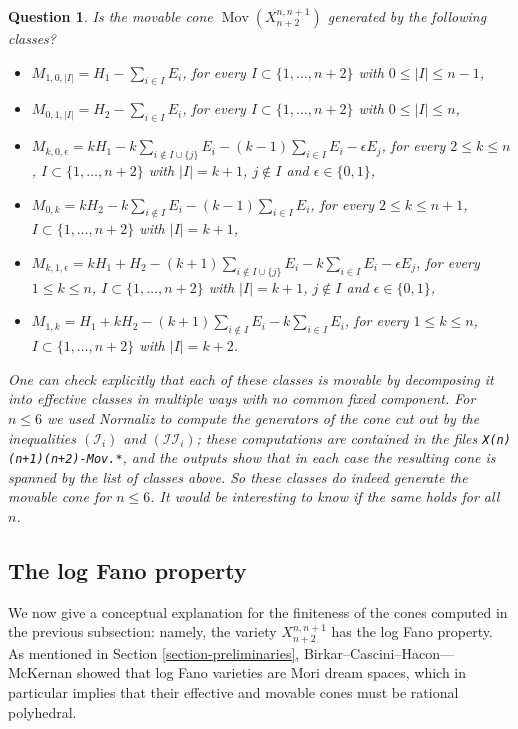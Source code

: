 \documentclass[a4paper,11pt]{article}
\newtheorem{question}[theorem]{Question}
\newcommand{\Mov}{\operatorname{Mov}}
\newcommand{\ourproductblowuptwo}{X^{n,n+1}_{n+2}}
\begin{document}
\begin{question}
Is the movable cone $\Mov(X^{n,n+1}_{n+2})$ generated by the following classes? 
\begin{itemize}
\item $M_{1,0,|I|}=H_1-\sum_{i\in I}E_i$, for every $I\subset \{1,\dots, n+2\}$ with $0\le |I|\le n-1$,
\item $M_{0,1,|I|}=H_2-\sum_{i\in I}E_i$, for every $I\subset \{1,\dots, n+2\}$ with $0\le |I|\le n$,
\item $M_{k,0,\epsilon}=kH_1-k\sum_{i\notin I\cup\{j\}}E_i- (k-1)\sum_{i\in I}E_i-\epsilon E_j$, for every $2\le k\le n$, $I\subset \{1,\dots, n+2\}$ with $|I|=k+1$, $j\notin I$ and $\epsilon\in\{0,1\}$,
\item $M_{0,k}=kH_2-k\sum_{i\notin I}E_i- (k-1)\sum_{i\in I}E_i$, for every $2\le k\le n+1$, $I\subset \{1,\dots, n+2\}$ with $|I|=k+1$,
\item $M_{k,1,\epsilon}=k H_1+H_2-(k+1)\sum_{i\notin I\cup\{j\}}E_i- k\sum_{i\in I}E_i-\epsilon E_j$, for every $1\le k\le n$, $I\subset \{1,\dots, n+2\}$ with $|I|=k+1$, $j\notin I$ and $\epsilon\in\{0,1\}$,
\item $M_{1,k}=H_1+kH_2-(k+1)\sum_{i\notin I}E_i- k\sum_{i\in I}E_i$, for every $1\le k\le n$, $I\subset \{1,\dots, n+2\}$ with $|I|=k+2$.
\end{itemize}
One can check explicitly that each of these classes is movable by decomposing it into effective classes in multiple ways with no common fixed component. 
For $n \leq 6$ we used Normaliz \cite{normaliz} to compute the generators of the cone cut out by the inequalities $(\mathcal{I}_i)$ and $(\mathcal{II}_i)$; these computations are contained in the files {\tt X(n)(n+1)(n+2)-Mov.*}, and the outputs show that in each case the resulting cone is spanned by the list of classes above. So these classes do indeed generate the movable cone for $n \leq 6$. It would be interesting to know if the same holds for all $n$.
\end{question}
\subsection{The log Fano property}
We now give a conceptual explanation for the finiteness of the cones computed in the previous subsection: namely, the variety $\ourproductblowuptwo$ has the log Fano property. As mentioned in Section \ref{section-preliminaries}, Birkar--Cascini--Hacon---McKernan showed that log Fano varieties are Mori dream spaces, which in particular implies that their effective and movable cones must be rational polyhedral. 
\end{document}
